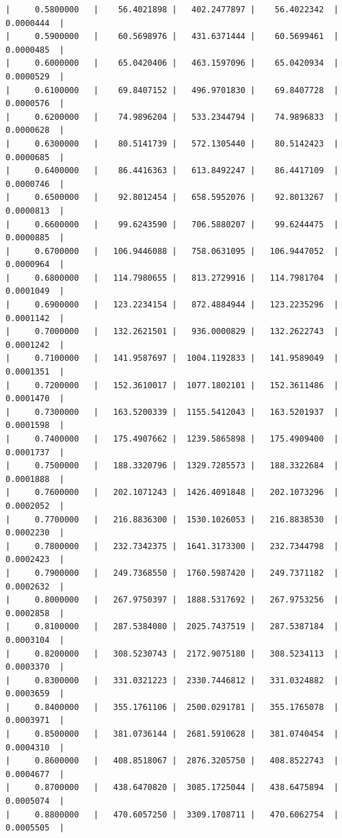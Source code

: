 \documentclass[14pt, russian]{scrartcl}
\begin{document}
\begin{verbatim}
|     0.5800000   |    56.4021898 |   402.2477897 |    56.4022342  |     0.0000444  |
|     0.5900000   |    60.5698976 |   431.6371444 |    60.5699461  |     0.0000485  |
|     0.6000000   |    65.0420406 |   463.1597096 |    65.0420934  |     0.0000529  |
|     0.6100000   |    69.8407152 |   496.9701830 |    69.8407728  |     0.0000576  |
|     0.6200000   |    74.9896204 |   533.2344794 |    74.9896833  |     0.0000628  |
|     0.6300000   |    80.5141739 |   572.1305440 |    80.5142423  |     0.0000685  |
|     0.6400000   |    86.4416363 |   613.8492247 |    86.4417109  |     0.0000746  |
|     0.6500000   |    92.8012454 |   658.5952076 |    92.8013267  |     0.0000813  |
|     0.6600000   |    99.6243590 |   706.5880207 |    99.6244475  |     0.0000885  |
|     0.6700000   |   106.9446088 |   758.0631095 |   106.9447052  |     0.0000964  |
|     0.6800000   |   114.7980655 |   813.2729916 |   114.7981704  |     0.0001049  |
|     0.6900000   |   123.2234154 |   872.4884944 |   123.2235296  |     0.0001142  |
|     0.7000000   |   132.2621501 |   936.0000829 |   132.2622743  |     0.0001242  |
|     0.7100000   |   141.9587697 |  1004.1192833 |   141.9589049  |     0.0001351  |
|     0.7200000   |   152.3610017 |  1077.1802101 |   152.3611486  |     0.0001470  |
|     0.7300000   |   163.5200339 |  1155.5412043 |   163.5201937  |     0.0001598  |
|     0.7400000   |   175.4907662 |  1239.5865898 |   175.4909400  |     0.0001737  |
|     0.7500000   |   188.3320796 |  1329.7285573 |   188.3322684  |     0.0001888  |
|     0.7600000   |   202.1071243 |  1426.4091848 |   202.1073296  |     0.0002052  |
|     0.7700000   |   216.8836300 |  1530.1026053 |   216.8838530  |     0.0002230  |
|     0.7800000   |   232.7342375 |  1641.3173300 |   232.7344798  |     0.0002423  |
|     0.7900000   |   249.7368550 |  1760.5987420 |   249.7371182  |     0.0002632  |
|     0.8000000   |   267.9750397 |  1888.5317692 |   267.9753256  |     0.0002858  |
|     0.8100000   |   287.5384080 |  2025.7437519 |   287.5387184  |     0.0003104  |
|     0.8200000   |   308.5230743 |  2172.9075180 |   308.5234113  |     0.0003370  |
|     0.8300000   |   331.0321223 |  2330.7446812 |   331.0324882  |     0.0003659  |
|     0.8400000   |   355.1761106 |  2500.0291781 |   355.1765078  |     0.0003971  |
|     0.8500000   |   381.0736144 |  2681.5910628 |   381.0740454  |     0.0004310  |
|     0.8600000   |   408.8518067 |  2876.3205750 |   408.8522743  |     0.0004677  |
|     0.8700000   |   438.6470820 |  3085.1725044 |   438.6475894  |     0.0005074  |
|     0.8800000   |   470.6057250 |  3309.1708711 |   470.6062754  |     0.0005505  |

\end{verbatim}
\end{document}
